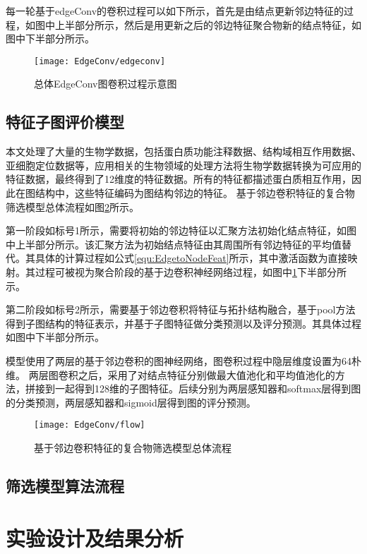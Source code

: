 每一轮基于edgeConv的卷积过程可以如下所示，首先是由结点更新邻边特征的过程，如图中上半部分所示，然后是用更新之后的邻边特征聚合物新的结点特征，如图中下半部分所示。

\begin{figure}[htbp]
    \centering
    \texttt{[image: EdgeConv/edgeconv]}
    \caption{总体EdgeConv图卷积过程示意图}
    \label{fig:EdgeConv/edgeconv}
\end{figure}

\subsection{特征子图评价模型}

本文处理了大量的生物学数据，包括蛋白质功能注释数据、结构域相互作用数据、亚细胞定位数据等，应用相关的生物领域的处理方法将生物学数据转换为可应用的特征数据，最终得到了12维度的特征数据。所有的特征都描述蛋白质相互作用，因此在图结构中，这些特征编码为图结构邻边的特征。
基于邻边卷积特征的复合物筛选模型总体流程如图\ref{fig:EdgeConv/flow}所示。

第一阶段如标号1所示，需要将初始的邻边特征以汇聚方法初始化结点特征，如图中上半部分所示。该汇聚方法为初始结点特征由其周围所有邻边特征的平均值替代。其具体的计算过程如公式\ref{equ:EdgetoNodeFeat}所示，其中激活函数为直接映射。其过程可被视为聚合阶段的基于边卷积神经网络过程，如图中\ref{fig:EdgeConv/edgeconv}下半部分所示。

第二阶段如标号2所示，需要基于邻边卷积将特征与拓扑结构融合，基于pool方法得到子图结构的特征表示，并基于子图特征做分类预测以及评分预测。其具体过程如图中下半部分所示。

模型使用了两层的基于邻边卷积的图神经网络，图卷积过程中隐层维度设置为64朴维。
两层图卷积之后，采用了对结点特征分别做最大值池化和平均值池化的方法，拼接到一起得到128维的子图特征。后续分别为两层感知器和softmax层得到图的分类预测，两层感知器和sigmoid层得到图的评分预测。


\begin{figure}[htbp]
    \centering
    \texttt{[image: EdgeConv/flow]}
    \caption{基于邻边卷积特征的复合物筛选模型总体流程}
    \label{fig:EdgeConv/flow}
\end{figure}

\subsection{筛选模型算法流程}

\section{实验设计及结果分析}
\label{section:EdgeConv:experience}

